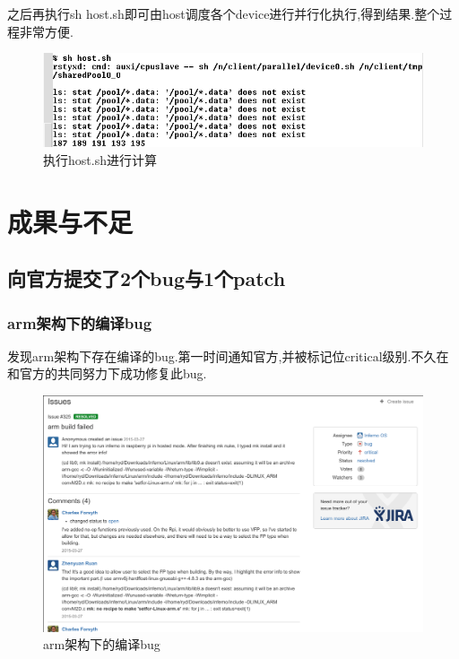 \documentclass[paper=a4]{ctexart} %
\numberwithin{equation}{section} %
\numberwithin{figure}{section} %
\numberwithin{table}{section} %
\begin{document}
 之后再执行sh host.sh即可由host调度各个device进行并行化执行,得到结果.整个过程非常方便.

    \begin{figure}[htbp]
      \centering
      \includegraphics[width=\textwidth]{pic/sh_host.png}
      \caption{执行host.sh进行计算}
    \end{figure}

\section{成果与不足}

\subsection{向官方提交了2个bug与1个patch}

\subsubsection{arm架构下的编译bug}
发现arm架构下存在编译的bug.第一时间通知官方,并被标记位critical级别.不久在和官方的共同努力下成功修复此bug.

    \begin{figure}[htbp]
      \centering
      \includegraphics[width=1\textwidth]{pic/bug1.png}
      \caption{arm架构下的编译bug}
    \end{figure}
\end{document}
